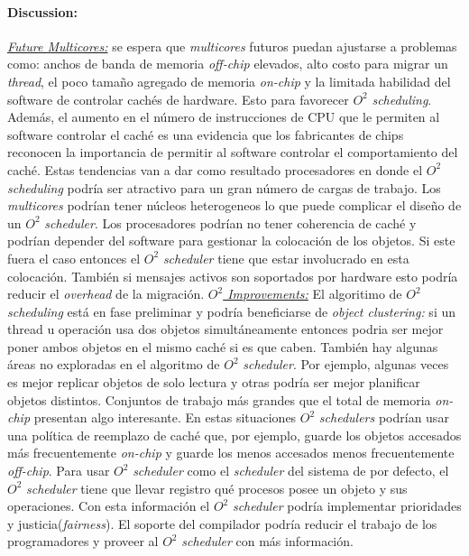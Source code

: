 \paragraph{\textnormal{\textbf{Discussion:}}}
\underline{\emph{Future Multicores:}} se espera que \emph{multicores} futuros puedan ajustarse a problemas como: anchos de banda de memoria \emph{off-chip} elevados, alto costo para migrar un \emph{thread}, el poco tamaño agregado de memoria \emph{on-chip} y la limitada habilidad del software de controlar cachés de hardware. Esto para favorecer $O^2$ \emph{scheduling}. Además, el aumento en el número de instrucciones de CPU que le permiten al software controlar el caché es una evidencia que los fabricantes de chips reconocen la importancia de permitir al software controlar el comportamiento del caché. Estas tendencias van a dar como resultado procesadores en donde el $O^2$ \emph{scheduling} podría ser atractivo para un gran número de cargas de trabajo. Los \emph{multicores} podrían tener núcleos heterogeneos lo que puede complicar el diseño de un $O^2$ \emph{scheduler}. Los procesadores podrían no tener coherencia de caché y podrían depender del software para gestionar la colocación de los objetos. Si este fuera el caso entonces el $O^2$ \emph{scheduler} tiene que estar involucrado en esta colocación. También si mensajes activos son soportados por hardware esto podría reducir el \emph{overhead} de la migración. \underline{\emph{$O^2$ Improvements:}} El algoritimo de $O^2$ \emph{scheduling} está en fase preliminar y podría beneficiarse de \emph{object clustering:} si un thread u operación usa dos objetos simultáneamente entonces podria ser mejor poner ambos objetos en el mismo caché si es que caben. También hay algunas áreas no exploradas en el algoritmo de $O^2$ \emph{scheduler}. Por ejemplo, algunas veces es mejor replicar objetos de solo lectura y otras podría ser mejor planificar objetos distintos. Conjuntos de trabajo más grandes que el total de memoria \emph{on-chip} presentan algo interesante. En estas situaciones $O^2$ \emph{schedulers} podrían usar una política de reemplazo de caché que, por ejemplo, guarde los objetos accesados más frecuentemente \emph{on-chip} y guarde los menos accesados menos frecuentemente \emph{off-chip}. Para usar $O^2$ \emph{scheduler} como el \emph{scheduler} del sistema de por defecto, el $O^2$ \emph{scheduler} tiene que llevar registro qué procesos posee un objeto y sus operaciones. Con esta información el $O^2$ \emph{scheduler} podría implementar prioridades y justicia(\emph{fairness}). El soporte del compilador podría reducir el trabajo de los programadores y proveer al $O^2$ \emph{scheduler} con más información.



